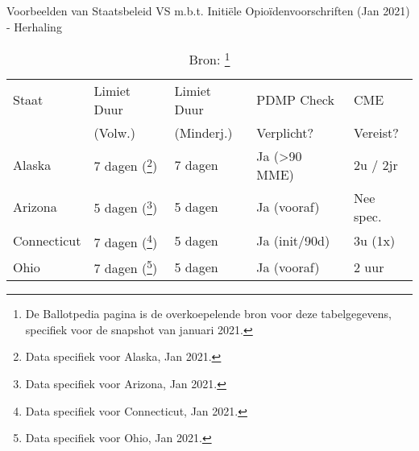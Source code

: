 \documentclass[11pt, a4paper]{report} %
\begin{document}
\begin{table}[htbp]
    \centering
    \caption{Voorbeelden van Staatsbeleid VS m.b.t. Initiële Opioïdenvoorschriften (Jan 2021) - Herhaling}
    \label{tab:state_limits_repeat_preventie} %
    \begin{tabular}{l l l l l}
        \toprule
        Staat        & Limiet Duur & Limiet Duur & PDMP Check  & CME      \\
                     & (Volw.)     & (Minderj.)  & Verplicht? & Vereist? \\
        \midrule
        Alaska       & 7 dagen (\cite{BallotpediaStateLimits}\footnote{Data specifiek voor Alaska, Jan 2021.})     & 7 dagen     & Ja (>90 MME) & 2u / 2jr \\
        Arizona      & 5 dagen (\cite{BallotpediaStateLimits}\footnote{Data specifiek voor Arizona, Jan 2021.})     & 5 dagen     & Ja (vooraf) & Nee spec. \\
        Connecticut  & 7 dagen (\cite{BallotpediaStateLimits}\footnote{Data specifiek voor Connecticut, Jan 2021.})     & 5 dagen     & Ja (init/90d)& 3u (1x)  \\
        Ohio         & 7 dagen (\cite{BallotpediaStateLimits}\footnote{Data specifiek voor Ohio, Jan 2021.})     & 5 dagen     & Ja (vooraf) & 2 uur    \\
        \bottomrule
    \end{tabular}
    \caption*{\footnotesize Bron: \parencite{BallotpediaStateLimits}\footnote{De Ballotpedia pagina is de overkoepelende bron voor deze tabelgegevens, specifiek voor de snapshot van januari 2021.}}
\end{table}
\end{document}
